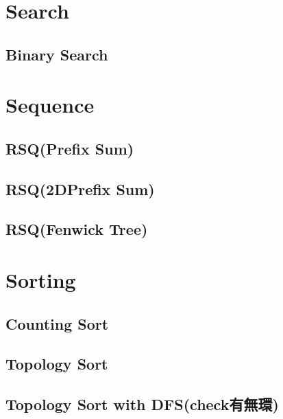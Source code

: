 \section{Search}

\subsection{Binary Search}

\section{Sequence}

\subsection{RSQ(Prefix Sum)}


\subsection{RSQ(2DPrefix Sum)}


\subsection{RSQ(Fenwick Tree)}

\section{Sorting}

\subsection{Counting Sort}


\subsection{Topology Sort}


\subsection{Topology Sort with DFS(check有無環)}


